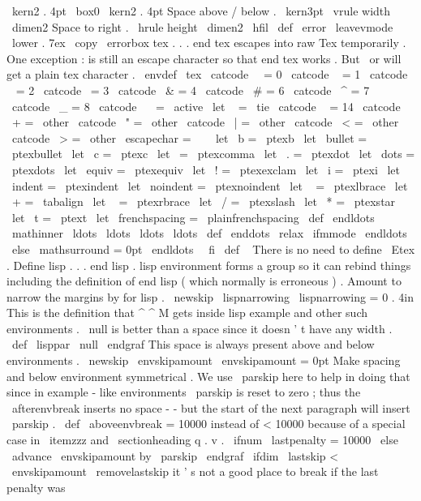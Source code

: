 {{{{{
\
kern2
.
4pt
\
box0
\
kern2
.
4pt
}
%
Space
above
/
below
.
\
kern3pt
\
vrule
width
\
dimen2
}
%
Space
to
right
.
\
hrule
height
\
dimen2
}
\
hfil
}
%
\
def
\
error
{
\
leavevmode
\
lower
.
7ex
\
copy
\
errorbox
}
%
tex
.
.
.
end
tex
escapes
into
raw
Tex
temporarily
.
%
One
exception
:
is
still
an
escape
character
so
that
end
tex
works
.
%
But
\
or
will
get
a
plain
tex
character
.
\
envdef
\
tex
{
%
\
catcode
\
\
=
0
\
catcode
\
{
=
1
\
catcode
\
}
=
2
\
catcode
\
=
3
\
catcode
\
&
=
4
\
catcode
\
#
=
6
\
catcode
\
^
=
7
\
catcode
\
_
=
8
\
catcode
\
~
=
\
active
\
let
~
=
\
tie
\
catcode
\
%
=
14
\
catcode
\
+
=
\
other
\
catcode
\
"
=
\
other
\
catcode
\
|
=
\
other
\
catcode
\
<
=
\
other
\
catcode
\
>
=
\
other
\
escapechar
=
\
\
%
\
let
\
b
=
\
ptexb
\
let
\
bullet
=
\
ptexbullet
\
let
\
c
=
\
ptexc
\
let
\
=
\
ptexcomma
\
let
\
.
=
\
ptexdot
\
let
\
dots
=
\
ptexdots
\
let
\
equiv
=
\
ptexequiv
\
let
\
!
=
\
ptexexclam
\
let
\
i
=
\
ptexi
\
let
\
indent
=
\
ptexindent
\
let
\
noindent
=
\
ptexnoindent
\
let
\
{
=
\
ptexlbrace
\
let
\
+
=
\
tabalign
\
let
\
}
=
\
ptexrbrace
\
let
\
/
=
\
ptexslash
\
let
\
*
=
\
ptexstar
\
let
\
t
=
\
ptext
\
let
\
frenchspacing
=
\
plainfrenchspacing
%
\
def
\
endldots
{
\
mathinner
{
\
ldots
\
ldots
\
ldots
\
ldots
}
}
%
\
def
\
enddots
{
\
relax
\
ifmmode
\
endldots
\
else
\
mathsurround
=
0pt
\
endldots
\
\
fi
}
%
\
def
\
{
}
%
}
%
There
is
no
need
to
define
\
Etex
.
%
Define
lisp
.
.
.
end
lisp
.
%
lisp
environment
forms
a
group
so
it
can
rebind
things
%
including
the
definition
of
end
lisp
(
which
normally
is
erroneous
)
.
%
Amount
to
narrow
the
margins
by
for
lisp
.
\
newskip
\
lispnarrowing
\
lispnarrowing
=
0
.
4in
%
This
is
the
definition
that
^
^
M
gets
inside
lisp
example
and
other
%
such
environments
.
\
null
is
better
than
a
space
since
it
doesn
'
t
%
have
any
width
.
\
def
\
lisppar
{
\
null
\
endgraf
}
%
This
space
is
always
present
above
and
below
environments
.
\
newskip
\
envskipamount
\
envskipamount
=
0pt
%
Make
spacing
and
below
environment
symmetrical
.
We
use
\
parskip
here
%
to
help
in
doing
that
since
in
example
-
like
environments
\
parskip
%
is
reset
to
zero
;
thus
the
\
afterenvbreak
inserts
no
space
-
-
but
the
%
start
of
the
next
paragraph
will
insert
\
parskip
.
%
\
def
\
aboveenvbreak
{
{
%
%
=
10000
instead
of
<
10000
because
of
a
special
case
in
\
itemzzz
and
%
\
sectionheading
q
.
v
.
\
ifnum
\
lastpenalty
=
10000
\
else
\
advance
\
envskipamount
by
\
parskip
\
endgraf
\
ifdim
\
lastskip
<
\
envskipamount
\
removelastskip
%
it
'
s
not
a
good
place
to
break
if
the
last
penalty
was
}}}
